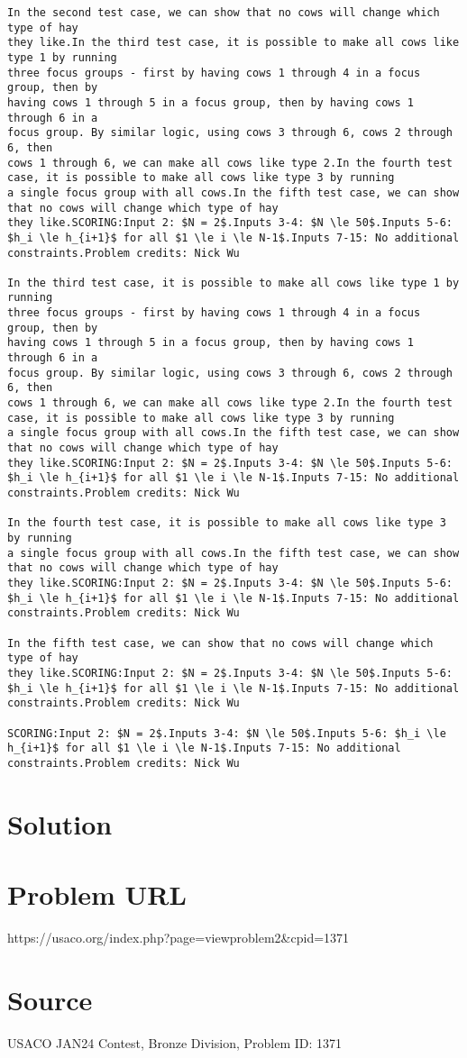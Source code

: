 \documentclass[12pt]{article}
\begin{document}
\begin{verbatim}
In the second test case, we can show that no cows will change which type of hay
they like.In the third test case, it is possible to make all cows like type 1 by running
three focus groups - first by having cows 1 through 4 in a focus group, then by
having cows 1 through 5 in a focus group, then by having cows 1 through 6 in a
focus group. By similar logic, using cows 3 through 6, cows 2 through 6, then
cows 1 through 6, we can make all cows like type 2.In the fourth test case, it is possible to make all cows like type 3 by running
a single focus group with all cows.In the fifth test case, we can show that no cows will change which type of hay
they like.SCORING:Input 2: $N = 2$.Inputs 3-4: $N \le 50$.Inputs 5-6: $h_i \le h_{i+1}$ for all $1 \le i \le N-1$.Inputs 7-15: No additional constraints.Problem credits: Nick Wu

In the third test case, it is possible to make all cows like type 1 by running
three focus groups - first by having cows 1 through 4 in a focus group, then by
having cows 1 through 5 in a focus group, then by having cows 1 through 6 in a
focus group. By similar logic, using cows 3 through 6, cows 2 through 6, then
cows 1 through 6, we can make all cows like type 2.In the fourth test case, it is possible to make all cows like type 3 by running
a single focus group with all cows.In the fifth test case, we can show that no cows will change which type of hay
they like.SCORING:Input 2: $N = 2$.Inputs 3-4: $N \le 50$.Inputs 5-6: $h_i \le h_{i+1}$ for all $1 \le i \le N-1$.Inputs 7-15: No additional constraints.Problem credits: Nick Wu

In the fourth test case, it is possible to make all cows like type 3 by running
a single focus group with all cows.In the fifth test case, we can show that no cows will change which type of hay
they like.SCORING:Input 2: $N = 2$.Inputs 3-4: $N \le 50$.Inputs 5-6: $h_i \le h_{i+1}$ for all $1 \le i \le N-1$.Inputs 7-15: No additional constraints.Problem credits: Nick Wu

In the fifth test case, we can show that no cows will change which type of hay
they like.SCORING:Input 2: $N = 2$.Inputs 3-4: $N \le 50$.Inputs 5-6: $h_i \le h_{i+1}$ for all $1 \le i \le N-1$.Inputs 7-15: No additional constraints.Problem credits: Nick Wu

SCORING:Input 2: $N = 2$.Inputs 3-4: $N \le 50$.Inputs 5-6: $h_i \le h_{i+1}$ for all $1 \le i \le N-1$.Inputs 7-15: No additional constraints.Problem credits: Nick Wu
\end{verbatim}

\section*{Solution}


\section*{Problem URL}
https://usaco.org/index.php?page=viewproblem2&cpid=1371

\section*{Source}
USACO JAN24 Contest, Bronze Division, Problem ID: 1371
\end{document}
